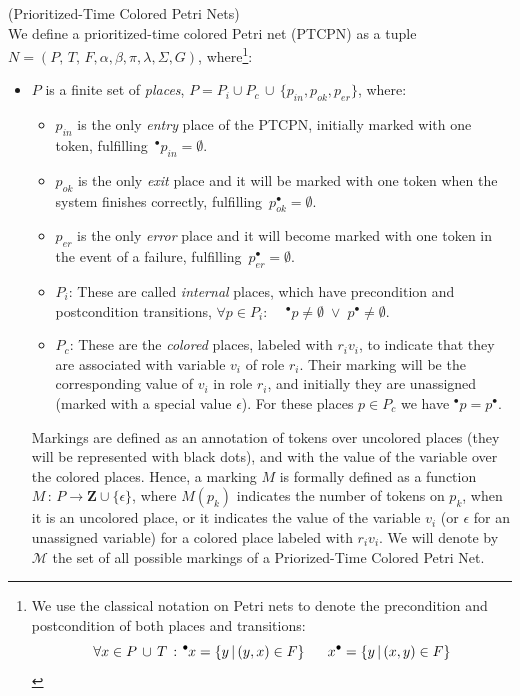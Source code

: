 \begin{definition} (Prioritized-Time Colored Petri Nets)\\
We define a prioritized-time colored Petri net (PTCPN) as a tuple
\linebreak $N=(P,\,T,\,F,\alpha,\beta,\pi,\lambda,\Sigma, G)$,
where\footnote{We use the classical notation on Petri nets to denote the
precondition and postcondition of both places and transitions:
%
\[ \forall x \in P\,\cup\,T\,:\,
\hspace*{-0.4em}~^{\bullet} \hspace*{-0.05em}x = \{ y \,|\, (y,x) \in F\}~~~~~
   x^{\bullet} = \{ y \,|\, (x,y) \in F\}
\] }:
\begin{itemize}
  \item $P$ is a finite set of {\em places},  $P= P_i \cup P_c\, 
        \cup\, \{p_{in}, p_{ok}, p_{er} \}$,
  where:
  \begin{itemize}
    \item $p_{in}$ is the only {\it entry} place of the PTCPN, initially 
          marked with one
          token, fulfilling $\,^\bullet p_{in} = \emptyset$.
%
    \item $p_{ok}$  is the only {\it exit} place and it will be 
          marked with one token  when the system
          finishes correctly, fulfilling $ \, p_{ok}^\bullet = \emptyset$.
    \item  $p_{er}$ is the only {\it error} place and it will 
           become marked with one token in the event of a failure,
           fulfilling
           $ \, p_{er}^\bullet = \emptyset $.
%
    \item $P_i$:  These are called {\it internal} places, which have
    precondition and postcondition transitions, $\forall p\in
    P_i:\quad \,^\bullet p \neq \emptyset \; \vee \; p^\bullet \neq \emptyset
    $.
    \item  $P_c$: These are the {\it colored}  places,  labeled with $r_iv_i$,
    to indicate that they are associated  with  variable
    $v_i$ of role $r_i$. Their marking will be the corresponding
    value of $v_i$ in role $r_i$, and initially  they are unassigned
    (marked with a special value $\epsilon$). For these places $p\in
    P_c$ we have $^\bullet p= p^\bullet$.
   \end{itemize}

Markings are defined  as an annotation of tokens over uncolored
places (they will be represented with black dots), and with the
value of the variable over the colored places. Hence, a marking $M$
is formally defined as a function \linebreak \mbox{$M\,:\,P
\rightarrow \mathbf{Z}\cup\{\epsilon\}$,} where $M(p_k)$ indicates
the number of tokens on $p_k$, when it is an uncolored place, or it
indicates the value of the variable $v_i$ (or $\epsilon$ for an
unassigned variable) for a colored place labeled with $r_iv_i$. We
will denote by $\mathcal{M}$ the set of all possible markings of a
Priorized-Time Colored Petri Net.


\end{itemize}
\end{definition}

